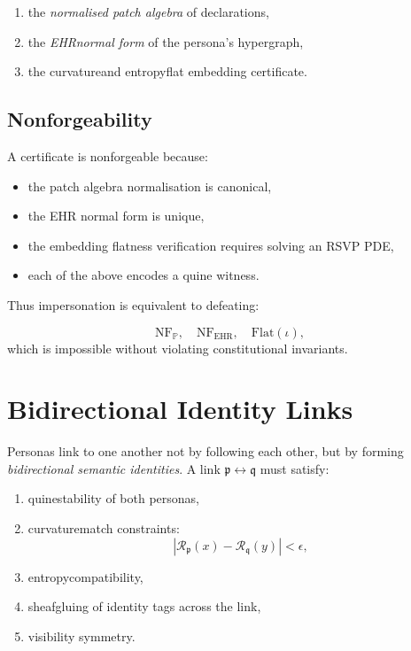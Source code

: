 \begin{enumerate}
  \item the \emph{normalised patch algebra} of declarations,
  \item the \emph{EHR\textendash normal form} of the persona’s hypergraph,
  \item the curvature\textendash and entropy\textendash flat embedding certificate.
\end{enumerate}

\subsection{Non\textendash forgeability}

A certificate is non\textendash forgeable because:

\begin{itemize}
  \item the patch algebra normalisation is canonical,
  \item the EHR normal form is unique,
  \item the embedding flatness verification requires solving an RSVP PDE,
  \item each of the above encodes a quine witness.
\end{itemize}

Thus impersonation is equivalent to defeating:

\[
\mathrm{NF}_{\mathbb{P}},\quad
\mathrm{NF}_{\mathrm{EHR}},\quad
\mathrm{Flat}(\iota),
\]
which is impossible without violating constitutional invariants.

\section{Bidirectional Identity Links}

Personas link to one another not by following each other,
but by forming \emph{bidirectional semantic identities}.
A link $\mathfrak{p} \leftrightarrow \mathfrak{q}$ must satisfy:

\begin{enumerate}
  \item quine\textendash stability of both personas,
  \item curvature\textendash match constraints:
        \[
        \left|
        \mathcal{R}_{\mathfrak{p}}(x)
        - \mathcal{R}_{\mathfrak{q}}(y)
        \right|
        < \epsilon,
        \]
  \item entropy\textendash compatibility,
  \item sheaf\textendash gluing of identity tags across the link,
  \item visibility symmetry.
\end{enumerate}

